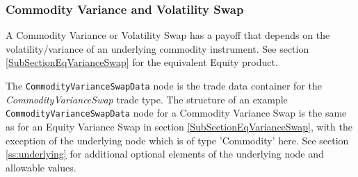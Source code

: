 \subsubsection{Commodity Variance and Volatility Swap}
\label{SubSectionCommodityVarianceSwap}

A Commodity Variance or Volatility Swap has a payoff that depends on the volatility/variance of an underlying 
commodity instrument. See section \ref{SubSectionEqVarianceSwap} for the equivalent Equity product.

The \lstinline!CommodityVarianceSwapData! node is the trade data container for the \emph{CommodityVarianceSwap} trade type. 
The structure of an example \lstinline!CommodityVarianceSwapData! node for a Commodity Variance Swap is the same as for an Equity Variance Swap in section
\ref{SubSectionEqVarianceSwap}, with the exception of the underlying node which is of type 'Commodity' here.
See section \ref{ss:underlying} for additional optional elements of the underlying node and allowable values.
